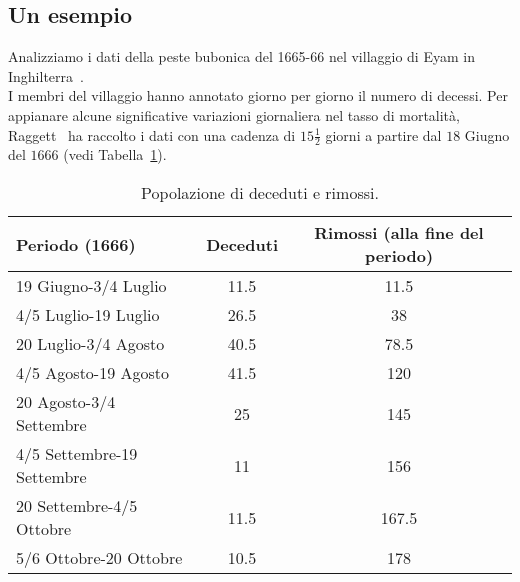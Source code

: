 \subsection{Un esempio}
Analizziamo i dati della peste bubonica del 1665-66 nel villaggio di Eyam in Inghilterra~\cite{raggett1982stochastic}. \\
I membri del villaggio hanno annotato giorno per giorno il numero di decessi. Per appianare alcune significative variazioni giornaliera nel tasso di mortalit\`a,  Raggett~\cite{raggett1982stochastic} ha raccolto  i dati con una cadenza di $15 \frac{1}{2}$ giorni a partire dal $18$ Giugno del $1666$ (vedi Tabella~\ref{table::1}).
\begin{table}[!ht]
\centering
\caption{Popolazione di deceduti e rimossi.}
\label{table::1}
\begin{tabular}{l | c | c }

Periodo (1666) & Deceduti & Rimossi (alla fine del periodo) \\
\hline

19 Giugno-3/4 Luglio & 11.5 & 11.5\\
4/5 Luglio-19 Luglio & 26.5 & 38\\ 
20 Luglio-3/4 Agosto & 40.5 & 78.5\\
4/5 Agosto-19 Agosto & 41.5 & 120\\
20 Agosto-3/4 Settembre & 25 & 145\\
4/5 Settembre-19 Settembre & 11 & 156\\
20 Settembre-4/5 Ottobre & 11.5 & 167.5\\
5/6 Ottobre-20 Ottobre & 10.5 & 178\\

\end{tabular}

\end{table}

